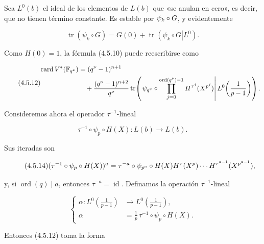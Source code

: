 Sea $L^0(b)$ el ideal de los elementos de $L(b)$ que «se anulan en
cero», es decir, que no tienen término constante. Es estable por
$\sisi{\psi}{\psi_k}\circ G$, y evidentemente

\begin{equation}\tag{4.5.11}
\operatorname{tr}(\psi_k\circ G)
=G(0)+\operatorname{tr}\!\left(\left.\psi_k\circ G\right|L^0\right).
\end{equation}

Como $H(0)=1$, la fórmula (4.5.10) puede reescribirse como

\begin{equation}\tag{4.5.12}
\begin{aligned}
\operatorname{card}V^*(\mathbb F_{q^\nu})
&=(q^\nu-1)^{n+1}\\
&\quad+\frac{(q^\nu-1)^{n+2}}{\sisi{q}{q^\nu}}
\operatorname{tr}\!\left(
\left.\psi_{\sisi{q}{q^\nu}}\circ
\prod_{j=0}^{\operatorname{ord}(q^\nu)-1}H^{\tau^j}(X^{p^j})
\right|L^0\!\left(\frac1{p-1}\right)\right).
\end{aligned}
\end{equation}

\pageoriginale

Consideremos ahora el operador $\tau^{-1}$-lineal

\begin{equation}\tag{4.5.13}
\tau^{-1}\circ\psi_p\circ H(X):L(b)\longrightarrow L(b).
\end{equation}

Sus iteradas son

\begin{equation}\tag{\sisi{5.4.14}{4.5.14}}
(\tau^{-1}\circ\psi_p\circ H(X))^a
=\tau^{-a}\circ\psi_{p^a}\circ
H(X)H^\tau(X^p)\cdots H^{\tau^{a-1}}(X^{p^{a-1}}),
\end{equation}

y, si $\operatorname{ord}(q)\mid a$, entonces
$\tau^{-a}=\operatorname{id}$. Definamos la operación $\tau^{-1}$-lineal

\begin{equation}\tag{4.5.15}
\left\{
\begin{aligned}
\alpha:L^0\!\left(\frac1{p-1}\right)
&\longrightarrow L^0\!\left(\frac1{p-1}\right),\\
\alpha&=\frac1p\,\tau^{-1}\circ\psi_p\circ H(X).
\end{aligned}
\right.
\end{equation}

Entonces (4.5.12) toma la forma

